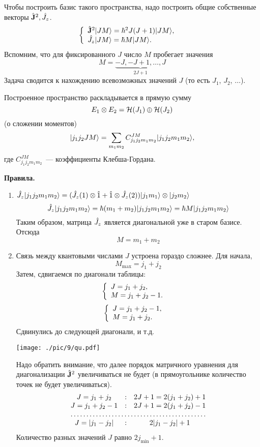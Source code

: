 Чтобы построить базис такого пространства, надо построить общие собственные векторы $\Hat{\mathbf J}^2, \Hat J_z$.
$$
    \left\{
      \begin{array}{ll}
        \Hat{\mathbf J}^2 | JM \rangle = \hbar^2 J(J+1) | JM \rangle, & \hbox{} \\
        \Hat J_z | JM \rangle = \hbar M | JM \rangle. & \hbox{}
      \end{array}
    \right.
$$
Вспомним, что для фиксированного $J$ число $M$ пробегает значения
$$
    M = \underbrace{-J, -J +1, \ldots, J}_{2J + 1}
$$
Задача сводится к нахождению всевозможных значений $J$ (то есть $J_1$, $J_2$, $\ldots$).

Построенное пространство раскладывается в прямую сумму
$$
    E_1 \otimes E_2 = \mathcal H(J_1) \oplus \mathcal H(J_2)
$$
\Th (о сложении моментов)
$$
    | j_1 j_2 J M \rangle = \sum_{m_1 m_2} C_{j_1 j_2 m_1 m_2}^{JM} | j_1 j_2 m_1 m_2 \rangle,
$$
где $C_{j_1 j_2 m_1 m_2}^{JM}$~--- коэффициенты Клебша-Гордана.

\textbf{Правила.}
\begin{enumerate}
  \item $\Hat J_z | j_1 j_2 m_1 m_2 \rangle = (\Hat J_z(1) \otimes \Hat 1 + \Hat 1 \otimes \Hat J_z(2)) | j_1 m_1 \rangle \otimes | j_2 m_2 \rangle$
  $$
    \Hat J_z | j_1 j_2 m_1 m_2 \rangle = \hbar(m_1 + m_2) | j_1 j_2 m_1 m_2 \rangle = \hbar M| j_1 j_2 m_1 m_2 \rangle
  $$
  Таким образом, матрица $\Hat J_z$ является диагональной уже в старом базисе. Отсюда
  $$
    M = m_1 + m_2
  $$
  \item Связь между квантовыми числами $J$ устроена гораздо сложнее.
  Для начала,
  $$
    M_{\max} = j_1 + j_2
  $$
  Затем, сдвигаемся по диагонали таблицы:
  $$
    \left\{
      \begin{array}{ll}
        J = j_1 + j_2, & \hbox{} \\
        M = j_1 + j_2 - 1. & \hbox{}
      \end{array}
    \right.
  $$
  $$
    \left\{
      \begin{array}{ll}
        J = j_1 + j_2 - 1, & \hbox{} \\
        M = j_1 + j_2. & \hbox{}
      \end{array}
    \right.
  $$
  Сдвинулись до следующей диагонали, и т.д.
  
  \centerline{\texttt{[image: ./pic/9/qu.pdf]}}
  
  Надо обратить внимание, что далее порядок матричного уравнения для диагонализации $\Hat{\mathbf J}^2$ увеличиваться не будет (в прямоугольнике количество точек не будет увеличиваться).
  $$
    \begin{array}{ccc}
      J = j_1 + j_2 & : & 2J + 1 = 2 (j_1 + j_2) + 1 \\
      J = j_1 + j_2 - 1 & : & 2 J + 1 = 2(j_1 + j_2) - 1 \\
      \hdotsfor{3} \\
      J = |j_1 - j_2| & : & 2|j_1 - j_2| + 1
    \end{array}
  $$
  Количество разных значений $J$ равно $2 j_{\min} + 1$.
\end{enumerate}

